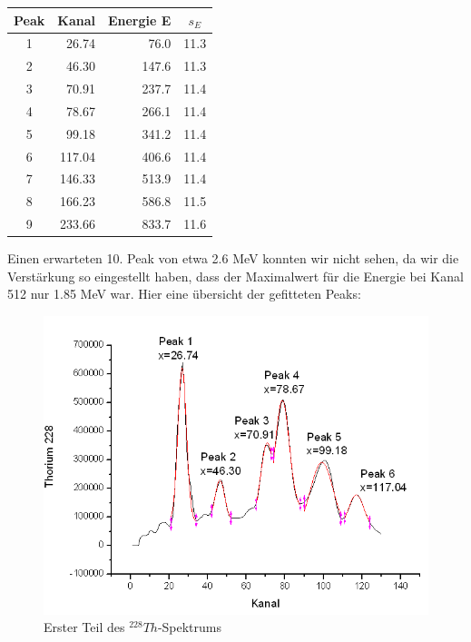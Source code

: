 \begin{center}
\begin{tabular}{| c | r | r | c |} \hline
Peak & Kanal & Energie E & $s_E$\\ \hline
1 & 26.74 & 76.0 & 11.3\\
2 & 46.30 & 147.6 & 11.3\\
3 & 70.91 & 237.7 & 11.4\\
4 & 78.67 & 266.1 & 11.4\\
5 & 99.18 & 341.2 & 11.4\\
6 & 117.04 & 406.6 & 11.4\\
7 & 146.33 & 513.9 & 11.4\\
8 & 166.23 & 586.8 & 11.5\\
9 & 233.66 & 833.7 & 11.6\\ \hline
\end{tabular}
\end{center}

Einen erwarteten 10. Peak von etwa 2.6 MeV konnten wir nicht sehen, da wir die Verstärkung so eingestellt haben, dass der Maximalwert für die Energie bei Kanal 512 nur 1.85 MeV war. Hier eine übersicht der gefitteten Peaks:

\begin{figure}[H]
\centering \includegraphics[width = \textwidth]{auswertung/Th1.png}
\caption{Erster Teil des $^{228}Th$-Spektrums}
\end{figure}

